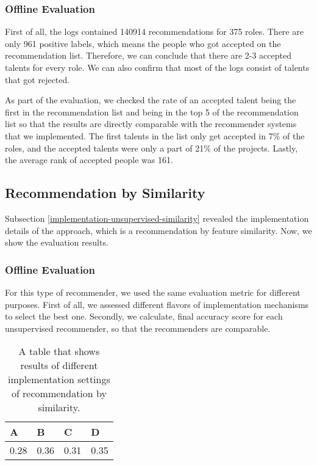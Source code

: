 \subsubsection{Offline Evaluation}

First of all, the logs contained 140914 recommendations for 375 roles. There are only 961 positive labels, which means the people who got accepted on the recommendation list. Therefore, we can conclude that there are 2-3 accepted talents for every role. We can also confirm that most of the logs consist of talents that got rejected. 

As part of the evaluation, we checked the rate of an accepted talent being the first in the recommendation list and being in the top 5 of the recommendation list so that the results are directly comparable with the recommender systems that we implemented. The first talents in the list only get accepted in 7\% of the roles, and the accepted talents were only a part of 21\% of the projects. Lastly, the average rank of accepted people was 161. 

\subsection{Recommendation by Similarity}\label{ev-rec-sim}

Subsection \ref{implementation-unsupervised-similarity} revealed the implementation details of the approach, which is a recommendation by feature similarity. Now, we show the evaluation results. 

\subsubsection{Offline Evaluation}

For this type of recommender, we used the same evaluation metric for different purposes. First of all, we assessed different flavors of implementation mechanisms to select the best one. Secondly, we calculate, final accuracy score for each unsupervised recommender, so that the recommenders are comparable.

\begin{table}[htpb]
	\caption[Evaluation mid-results]{A table that shows results of different implementation settings of recommendation by similarity.}\label{tab:evaluation-rec-similarity}
	\centering
	\begin{tabular}{l l l l}
		\toprule
		A & B & C & D \\
		\midrule
		0.28 & 0.36 & 0.31 & 0.35 \\
		\bottomrule
	\end{tabular}
\end{table}

